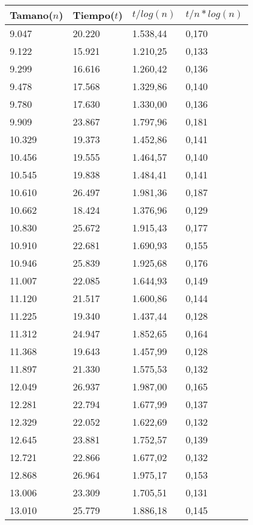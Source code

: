 \begin{table}[H]
\parbox{0.3\textwidth}{
  \begin{tabular}{| l | l | l |l |}
    \hline
    Tamano($n$) & Tiempo($t$) & $t / log(n)$ & $t / n*log(n)$ \\ \hline
9.047	&	20.220	&	1.538,44	&	0,170	\\ \hline
9.122	&	15.921	&	1.210,25	&	0,133	\\ \hline
9.299	&	16.616	&	1.260,42	&	0,136	\\ \hline
9.478	&	17.568	&	1.329,86	&	0,140	\\ \hline
9.780	&	17.630	&	1.330,00	&	0,136	\\ \hline
9.909	&	23.867	&	1.797,96	&	0,181	\\ \hline
10.329	&	19.373	&	1.452,86	&	0,141	\\ \hline
10.456	&	19.555	&	1.464,57	&	0,140	\\ \hline
10.545	&	19.838	&	1.484,41	&	0,141	\\ \hline
10.610	&	26.497	&	1.981,36	&	0,187	\\ \hline
10.662	&	18.424	&	1.376,96	&	0,129	\\ \hline
10.830	&	25.672	&	1.915,43	&	0,177	\\ \hline
10.910	&	22.681	&	1.690,93	&	0,155	\\ \hline
10.946	&	25.839	&	1.925,68	&	0,176	\\ \hline
11.007	&	22.085	&	1.644,93	&	0,149	\\ \hline
11.120	&	21.517	&	1.600,86	&	0,144	\\ \hline
11.225	&	19.340	&	1.437,44	&	0,128	\\ \hline
11.312	&	24.947	&	1.852,65	&	0,164	\\ \hline
11.368	&	19.643	&	1.457,99	&	0,128	\\ \hline
11.897	&	21.330	&	1.575,53	&	0,132	\\ \hline
12.049	&	26.937	&	1.987,00	&	0,165	\\ \hline
12.281	&	22.794	&	1.677,99	&	0,137	\\ \hline
12.329	&	22.052	&	1.622,69	&	0,132	\\ \hline
12.645	&	23.881	&	1.752,57	&	0,139	\\ \hline
12.721	&	22.866	&	1.677,02	&	0,132	\\ \hline
12.868	&	26.964	&	1.975,17	&	0,153	\\ \hline
13.006	&	23.309	&	1.705,51	&	0,131	\\ \hline
13.010	&	25.779	&	1.886,18	&	0,145	\\ \hline

\end{tabular}}
\end{table}
